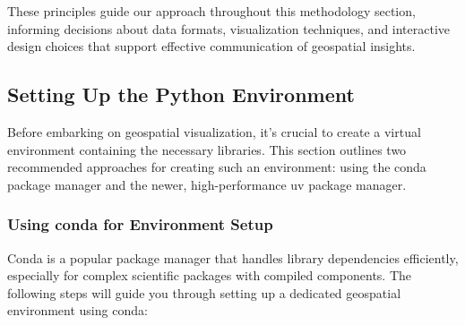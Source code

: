 These principles guide our approach throughout this methodology section, informing decisions about data formats, visualization techniques, and interactive design choices that support effective communication of geospatial insights.

\subsection{Setting Up the Python Environment}

Before embarking on geospatial visualization, it's crucial to create a virtual environment containing the necessary libraries. This section outlines two recommended approaches for creating such an environment: using the conda package manager and the newer, high-performance uv package manager.

\subsubsection{Using conda for Environment Setup}

Conda is a popular package manager that handles library dependencies efficiently, especially for complex scientific packages with compiled components. The following steps will guide you through setting up a dedicated geospatial environment using conda:

